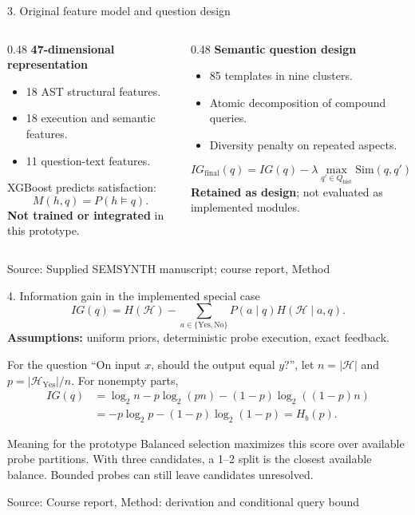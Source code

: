 \documentclass[aspectratio=169,10pt]{beamer}
\newcommand{\source}[1]{\par\vfill{\scriptsize\color{gray}Source: #1\par}}
\begin{document}
\begin{frame}{3. Original feature model and question design}
  \begin{columns}[T]
    \begin{column}{0.48\textwidth}
      \textbf{47-dimensional representation}
      \begin{itemize}
        \item 18 AST structural features.
        \item 18 execution and semantic features.
        \item 11 question-text features.
      \end{itemize}
      \par\medskip
      XGBoost predicts satisfaction:
      \[
        M(h,q)=P(h\models q).
      \]
      \textbf{Not trained or integrated} in this prototype.
    \end{column}
    \begin{column}{0.48\textwidth}
      \textbf{Semantic question design}
      \begin{itemize}
        \item 85 templates in nine clusters.
        \item Atomic decomposition of compound queries.
        \item Diversity penalty on repeated aspects.
      \end{itemize}
      \[
        IG_{\mathrm{final}}(q)=IG(q)-\lambda\max_{q'\in Q_{\mathrm{hist}}}\!\mathrm{Sim}(q,q').
      \]
      \textbf{Retained as design}; not evaluated as implemented modules.
    \end{column}
  \end{columns}
  \source{Supplied SEMSYNTH manuscript; course report, Method}
\end{frame}

\begin{frame}{4. Information gain in the implemented special case}
  \[
    IG(q)=H(\mathcal H)-\sum_{a\in\{\mathrm{Yes,No}\}}P(a\mid q)H(\mathcal H\mid a,q).
  \]
  \textbf{Assumptions:} uniform priors, deterministic probe execution, exact feedback.
  \par\medskip
  For the question ``On input $x$, should the output equal $y$?'', let
  $n=|\mathcal H|$ and $p=|\mathcal H_{\mathrm{Yes}}|/n$. For nonempty parts,
  \begin{align*}
    IG(q)&=\log_2 n-p\log_2(pn)-(1-p)\log_2((1-p)n)\\
         &=-p\log_2p-(1-p)\log_2(1-p)=H_b(p).
  \end{align*}
  \begin{block}{Meaning for the prototype}
    Balanced selection maximizes this score over available probe partitions.
    With three candidates, a 1--2 split is the closest available balance.
    Bounded probes can still leave candidates unresolved.
  \end{block}
  \source{Course report, Method: derivation and conditional query bound}
\end{frame}
\end{document}
